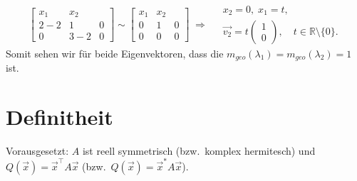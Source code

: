 \documentclass[a4paper,11pt,oneside,open=any,parskip=half, DIV=15]{scrreprt}
\begin{document}
      \[
         \left[
            \begin{array}{cc|c}   %
               x_1 & x_2 & \\ 
               \hline    %
               2-2 & 1   & 0\\
               0   & 3-2 & 0
            \end{array}
         \right]
         \sim
         \left[
            \begin{array}{cc|c}   %
               x_1 & x_2 & \\ 
               \hline    %
               0 & 1 & 0\\
               0 & 0 & 0
            \end{array}
         \right]
         \;\Rightarrow\;
            \begin{aligned}
               &x_2=0,\; x_1=t,\\
               &  \vec{v_2} = t \begin{pmatrix} 1 \\ 0 \end{pmatrix},
               \quad t\in\mathbb{R}\setminus\{0\}.
            \end{aligned}
      \]
      Somit sehen wir für beide Eigenvektoren, dass die \( m_{geo}(\lambda_1) = m_{geo}(\lambda_2) = 1 \) ist.

\section{Definitheit}

   Vorausgesetzt: \(A\) ist reell symmetrisch (bzw.\ komplex hermitesch) und
   \(Q(\vec x)=\vec x^{\top}A\vec x\) (bzw.\ \(Q(\vec x)=\vec x^{*}A\vec x\)).
\end{document}
